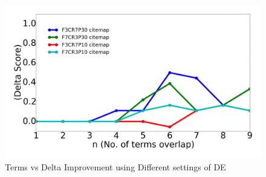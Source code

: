 \documentclass[twocolumn,5p,sort&compress]{elsarticle}
\theoremstyle{break}
\begin{document}
\begin{figure}[!b]
  \includegraphics[width=\linewidth]{./fig/citemap.png}
  \caption{Terms vs Delta Improvement using Different settings of DE}
  \label{fig:RQ4}
\end{figure}
\end{document}
